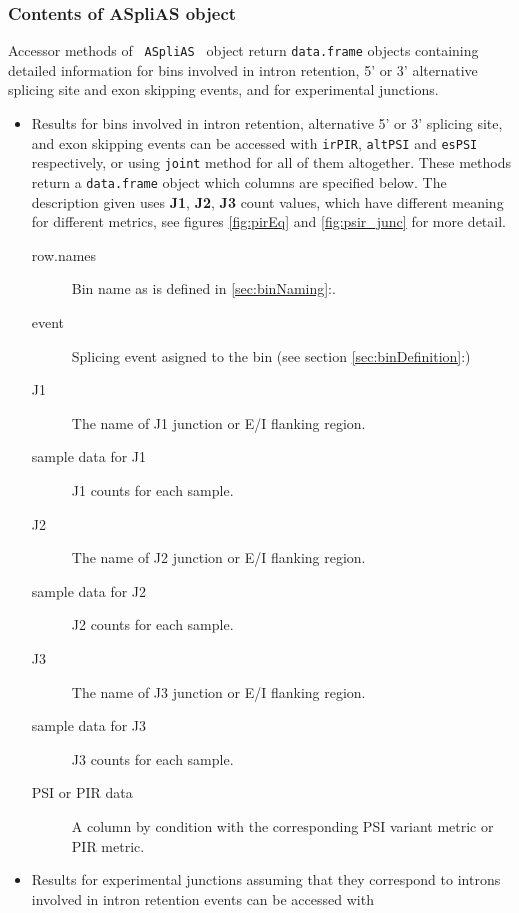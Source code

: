 \documentclass{article}
\newcommand{\secref}[1]{\ref{#1}:\nameref{#1}}
\begin{document}
\subsubsection{Contents of ASpliAS object}
\label{secASpliAsContent}

Accessor methods of \texttt{ ASpliAS } object return \texttt{data.frame}
objects containing detailed information for bins involved in intron retention,
5' or 3' alternative splicing site and exon skipping events, and for
experimental junctions. 

\begin{itemize}
  \item Results for bins involved in intron retention, alternative 5' or 3'
  splicing site, and exon skipping events can be accessed with \texttt{irPIR},
  \texttt{altPSI} and \texttt{esPSI} respectively, or using \texttt{joint}
  method for all of them altogether. These methods return a \texttt{data.frame}
  object which columns are specified below. The description given uses
  \textbf{J1}, \textbf{J2}, \textbf{J3} count values, which have different
  meaning for different metrics, see figures \ref{fig:pirEq} and
  \ref{fig:psir_junc} for more detail.
    \begin{description}
      \item[row.names] Bin name as is defined in \secref{sec:binNaming}.
      \item[event] Splicing event asigned to the bin (see section
      \ref{sec:binDefinition}:)
      \item[J1] The name of J1 junction or E/I flanking region.
      \item[sample data for J1] J1 counts for each sample.
      \item[J2] The name of J2 junction or E/I flanking region.
      \item[sample data for J2] J2 counts for each sample.
      \item[J3] The name of J3 junction or E/I flanking region.
      \item[sample data for J3] J3 counts for each sample.
      \item[PSI or PIR data] A column by condition with the corresponding PSI
      variant metric or PIR metric.
      \\
    \end{description}
  \item Results for experimental junctions assuming that they correspond to
  introns involved in intron retention events can be accessed with

\end{itemize}
\end{document}
